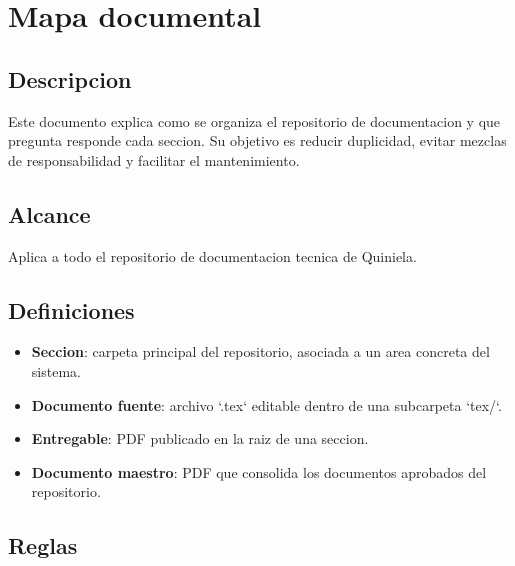 \section{Mapa documental}

\subsection{Descripcion}

Este documento explica como se organiza el repositorio de documentacion y que pregunta responde cada seccion. Su objetivo es reducir duplicidad, evitar mezclas de responsabilidad y facilitar el mantenimiento.

\subsection{Alcance}

Aplica a todo el repositorio de documentacion tecnica de Quiniela.

\subsection{Definiciones}

\begin{itemize}
  \item \textbf{Seccion}: carpeta principal del repositorio, asociada a un area concreta del sistema.
  \item \textbf{Documento fuente}: archivo `.tex` editable dentro de una subcarpeta `tex/`.
  \item \textbf{Entregable}: PDF publicado en la raiz de una seccion.
  \item \textbf{Documento maestro}: PDF que consolida los documentos aprobados del repositorio.
\end{itemize}

\subsection{Reglas}

